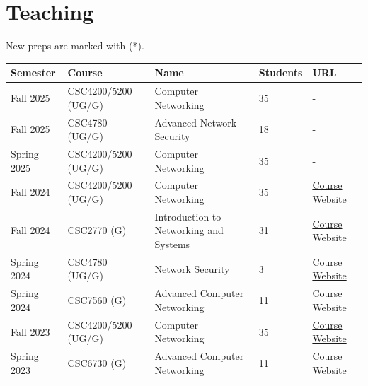 \newpage
\section{Teaching}
\textbf{}
New preps are marked with (*).

\begin{longtable}{|p{1.4cm}|p{2.1cm}|p{5.5cm}|p{1.6cm}|p{1.5cm}|}
    \hline
        \textbf{Semester} & \textbf{Course} & \textbf{Name} & \textbf{Students} & \textbf{URL} \\ \hline
           Fall 2025 & CSC4200/5200 (UG/G)  & Computer Networking & 35 & - \\ \hline        
           Fall 2025 & CSC4780 (UG/G)  & Advanced Network Security & 18 & - \\ \hline        
    
           Spring 2025 & CSC4200/5200 (UG/G)  & Computer Networking & 35 & - \\ \hline                               
               Fall 2024 & CSC4200/5200 (UG/G)  & Computer Networking & 35 & \href{https://tntech-ngin.github.io/F24-CSC4200/}{Course Website} \\ \hline        
        Fall 2024 & CSC2770 (G) & Introduction to Networking and Systems & 31 & \href{https://tntech-ngin.github.io/F24-CSC2770/}{Course Website} \\ \hline

       Spring 2024 & CSC4780 (UG/G)  & Network Security & 3 & \href{https://tntech-ngin.github.io/S24-CSC4780/}{Course Website} \\ \hline        
        Spring 2024 & CSC7560 (G) & Advanced Computer Networking & 11 & \href{https://tntech-ngin.github.io/S24-CSC7560/}{Course Website} \\ \hline
        
        Fall 2023 & CSC4200/5200 (UG/G)  & Computer Networking & 35 & \href{https://tntech-ngin.github.io/F23-CSC4200/}{Course Website} \\ \hline        
        Spring 2023 & CSC6730 (G) & Advanced Computer Networking & 11 & \href{https://tntech-ngin.github.io/S23-CSC6730/}{Course Website} \\ \hline
        

\end{longtable}
